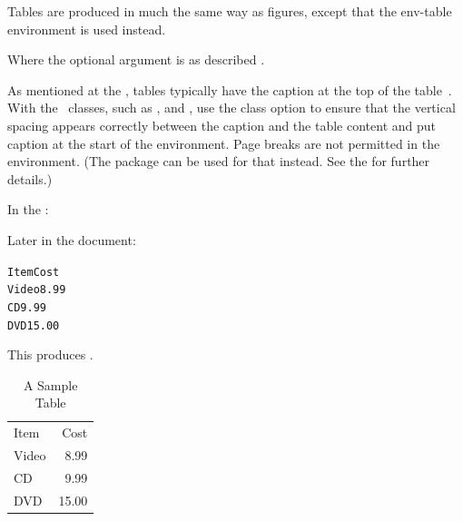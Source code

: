 Tables are produced in much the same way as figures, except that the
\gls{env-table} environment is used instead.
\begin{definition}
\end{definition}
Where the optional argument  is as described
.

As mentioned at the ,
tables typically have the caption at the top of the
table~\cite{turabian96}. With the \koma\ classes, such as
,  and , use the class
option  to ensure that the vertical
spacing appears correctly between the caption and the table content
and put \gls{caption} at the start of the 
environment. Page
breaks are not permitted in the 
environment. (The  package can be used for that
instead. See the   for 
further details.)


In the :
\begin{codeS}
\end{codeS}
Later in the document:
\begin{code}
\begin{alltt}
 Item   Cost
 Video  8.99
 CD     9.99
 DVD    15.00
\end{alltt}
\end{code}%
This produces .

\begin{table}[htbp]
\caption{A Sample Table}
\label{tab:sample}
\centering
\begin{makeimage}
\begin{tabular}{lr}
Item & Cost\\
Video & 8.99\\
CD    & 9.99\\
DVD   & 15.00
\end{tabular}
\end{makeimage}
\end{table}

